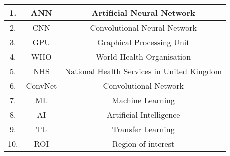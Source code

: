 \begin{longtable}[c]{|c|c|c|}
    \hline
    1. & ANN & Artificial Neural Network \\
    \hline
    2. & CNN & Convolutional Neural Network \\
    \hline
    3. & GPU & Graphical Processing Unit \\
    \hline
    4. & WHO & World Health Organisation \\
    \hline
    5. & NHS & National Health Services in United Kingdom \\
    \hline
    6. & ConvNet & Convolutional Network \\ 
    \hline
    7. & ML & Machine Learning \\ 
    \hline
    8. & AI & Artificial Intelligence \\
    \hline
    9. & TL & Transfer Learning \\
    \hline
    10. & ROI & Region of interest \\
    \hline
\end{longtable}